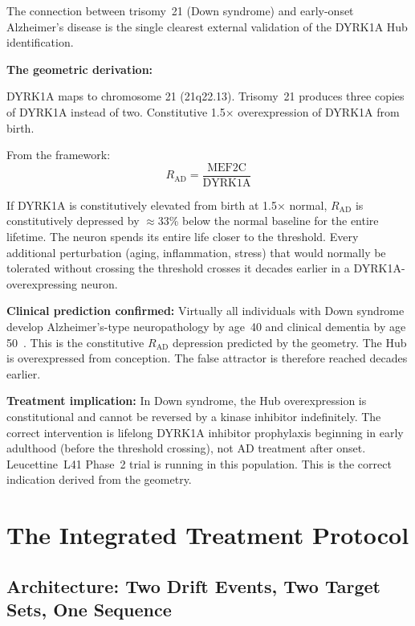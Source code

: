 \documentclass[12pt,a4paper]{article}
\newenvironment{derivenv}{%
  \begin{tcolorbox}[colback=lightgray,colframe=midgray,boxrule=0.5pt,
    arc=3pt,left=8pt,right=8pt,top=6pt,bottom=6pt,breakable]}{%
  \end{tcolorbox}}
\newcommand{\RAD}{R_{\mathrm{AD}}}
\begin{document}
The connection between trisomy~21 (Down syndrome) and
early-onset Alzheimer's disease is the single clearest
external validation of the DYRK1A Hub identification.

\begin{derivenv}
\textbf{The geometric derivation:}

DYRK1A maps to chromosome 21 (21q22.13). Trisomy~21
produces three copies of DYRK1A instead of two.
Constitutive 1.5× overexpression of DYRK1A from birth.

From the framework:
\[
\RAD = \frac{\text{MEF2C}}{\text{DYRK1A}}
\]

If DYRK1A is constitutively elevated from birth at 1.5×
normal, $\RAD$ is constitutively depressed by
$\approx$33\% below the normal baseline for the entire
lifetime. The neuron spends its entire life closer to
the threshold. Every additional perturbation (aging,
inflammation, stress) that would normally be tolerated
without crossing the threshold crosses it decades
earlier in a DYRK1A-overexpressing neuron.

\medskip
\textbf{Clinical prediction confirmed:}
Virtually all individuals with Down syndrome develop
Alzheimer's-type neuropathology by age~40 and
clinical dementia by age 50~\cite{Hartley2015}.
This is the constitutive $\RAD$ depression predicted
by the geometry. The Hub is overexpressed from
conception. The false attractor is therefore reached
decades earlier.

\medskip
\textbf{Treatment implication:}
In Down syndrome, the Hub overexpression is constitutional
and cannot be reversed by a kinase inhibitor indefinitely.
The correct intervention is lifelong DYRK1A inhibitor
prophylaxis beginning in early adulthood (before the
threshold crossing), not AD treatment after onset.
Leucettine~L41 Phase~2 trial is running in this
population. This is the correct indication derived
from the geometry.
\end{derivenv}

\section{The Integrated Treatment Protocol}

\subsection{Architecture: Two Drift Events, Two
Target Sets, One Sequence}
\end{document}
